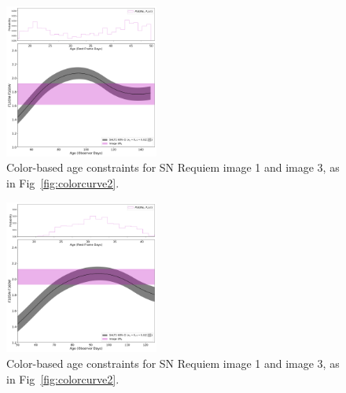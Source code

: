 \documentclass[12pt,dvipsnames]{article}
\def\SNABC{SN Requiem\xspace}
\begin{document}
\begin{figure}
    \centering
    \includegraphics[width=0.45\textwidth]{Images/colorcurve_image1.pdf}
    \caption{Color-based age constraints for \SNABC image 1 and image 3, as in Fig~\ref{fig:colorcurve2}.}
    \label{fig:colorcurve1}
\end{figure}
\begin{figure}
    \centering
    \includegraphics[width=0.45\textwidth]{Images/colorcurve_image3.pdf}
    \caption{Color-based age constraints for \SNABC image 1 and image 3, as in Fig~\ref{fig:colorcurve2}.}
    \label{fig:colorcurve3}
\end{figure}
\end{document}
